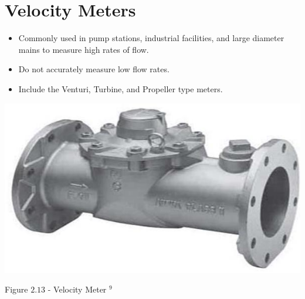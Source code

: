 \documentclass[10pt]{article}
\begin{document}
\section{Velocity Meters}
\begin{itemize}
  \item Commonly used in pump stations, industrial facilities, and large diameter mains to measure high rates of flow.

  \item Do not accurately measure low flow rates.

  \item Include the Venturi, Turbine, and Propeller type meters.

\end{itemize}
\includegraphics[max width=\textwidth]{VelocityMeter}

Figure $2.13$ - Velocity Meter ${ }^{9}$
\end{document}
